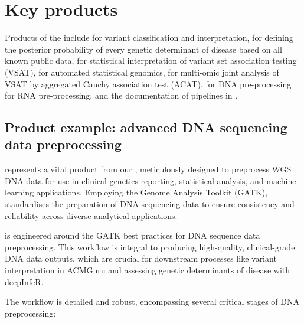 \section{Key products}

Products of the \pmu include
\acmguru for variant classification and interpretation,
\deepinfer for defining the posterior probability of every genetic determinant of disease based on all known public data,
\archipelago for statistical interpretation of variant set association testing (VSAT),
\skatrbrain for automated statistical genomics,
\macat for multi-omic joint analysis of VSAT by aggregated Cauchy association test (ACAT),
\dnasnake for DNA pre-processing
\rnasnake for RNA pre-processing, 
and the documentation of pipelines in
\pipedevdocdna. 

\subsection{Product example: advanced DNA sequencing data preprocessing}

\dnasnake represents a vital product from our \pmu, meticulously designed to preprocess WGS DNA data for use in clinical genetics reporting, statistical analysis, and machine learning applications. 
Employing the Genome Analysis Toolkit (GATK), \dnasnake standardises the preparation of DNA sequencing data to ensure consistency and reliability across diverse analytical applications.


\dnasnake is engineered around the GATK best practices for DNA sequence data preprocessing. This workflow is integral to producing high-quality, clinical-grade DNA data outputs, which are crucial for downstream processes like variant interpretation in ACMGuru and assessing genetic determinants of disease with deepInfeR.


The \dnasnake workflow is detailed and robust, encompassing several critical stages of DNA preprocessing:

